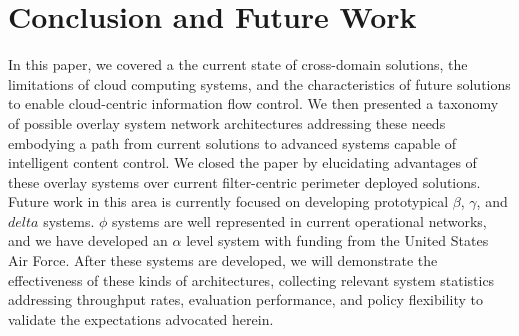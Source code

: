 \documentclass[10pt, conference, compsocconf]{IEEEtran}
\begin{document}
\section{Conclusion and Future Work}
In this paper, we covered a the current state of cross-domain solutions, the limitations of cloud computing systems, and the characteristics of future solutions to enable cloud-centric information flow control.  We then presented a taxonomy of possible overlay system network architectures addressing these needs embodying a path from current solutions to advanced systems capable of intelligent content control.  We closed the paper by elucidating advantages of these overlay systems over current filter-centric perimeter deployed solutions.  Future work in this area is currently focused on developing prototypical $\beta$, $\gamma$, and $delta$ systems.  $\phi$ systems are well represented in current operational networks, and we have developed an $\alpha$ level system with funding from the United States Air Force.  After these systems are developed, we will demonstrate the effectiveness of these kinds of architectures, collecting relevant system statistics addressing throughput rates, evaluation performance, and policy flexibility to validate the expectations advocated herein.



\end{document}

